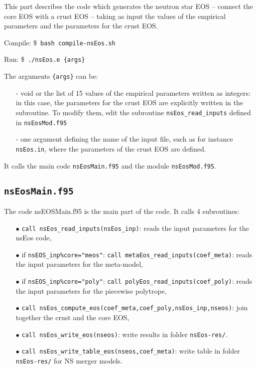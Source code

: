 \documentclass[11pt]{article}
\newcommand{\code}[1]{\colorbox{light-gray}{\mbox{\texttt{#1}}}}
\newcommand{\bash}[1]{\colorbox{light-gray}{\mbox{\$ \texttt{#1}}}}
\begin{document}
This part describes the code which generates the neutron star EOS -- connect the core EOS with a crust EOS --
taking as input the values of the empirical parameters and the parameters for the crust EOS.

Compile: \bash{bash compile-nsEos.sh}

Run: \bash{./nsEos.e \{args\}}

The arguments \code{\{args\}} can be:
\begin{enumerate}
\item[-] void or the list of 15 values of the empirical parameters written as integers: in this case, the parameters for the crust EOS are explicitly written in the subroutine. To modify them, edit the subroutine \code{nsEos\_read\_inputs} defined in \code{nsEosMod.f95}
\item[-] one argument defining the name of the input file, such as for instance \code{nsEos.in}, where the parameters of the crust EOS are defined.
\end{enumerate}

It calls the main code \code{nsEosMain.f95} and the module  \code{nsEosMod.f95}.

\subsection{\code{nsEosMain.f95}}

The code nsEOSMain.f95 is the main part of the code.
It calls 4 subroutines:
\begin{enumerate}
\item[$\bullet$] \code{call nsEos\_read\_inputs(nsEos\_inp)}: reads the input parameters for the nsEos code,
\item[$\bullet$] if \code{nsEOS\_inp\%core="meos"}: \code{call metaEos\_read\_inputs(coef\_meta)}: reads the input parameters for the meta-model,
\item[$\bullet$] if \code{nsEOS\_inp\%core="poly"}: \code{call polyEos\_read\_inputs(coef\_poly)}: reads the input parameters for the piecewise polytrope,
\item[$\bullet$] \code{call nsEos\_compute\_eos(coef\_meta,coef\_poly,nsEos\_inp,nseos)}: join together the crust and the core EOS,
\item[$\bullet$] \code{call nsEos\_write\_eos(nseos)}: write results in folder \code{nsEos-res/}.
\item[$\bullet$] \code{call nsEos\_write\_table\_eos(nseos,coef\_meta)}: write table in folder \code{nsEos-res/} for NS merger models.
\end{enumerate}
\end{document}
